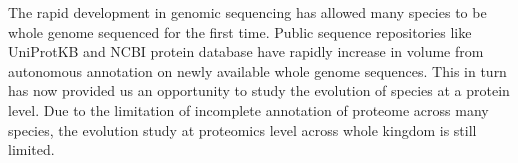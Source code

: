 The rapid development in genomic sequencing has allowed many species to be whole genome sequenced for the first time. Public sequence repositories like UniProtKB and NCBI protein database have rapidly increase in volume from autonomous annotation on newly available whole genome sequences. This in turn has now provided us an opportunity to study the evolution of species at a protein level.  Due to the limitation of incomplete annotation of proteome across many species, the evolution study at proteomics level across whole kingdom is still limited. 